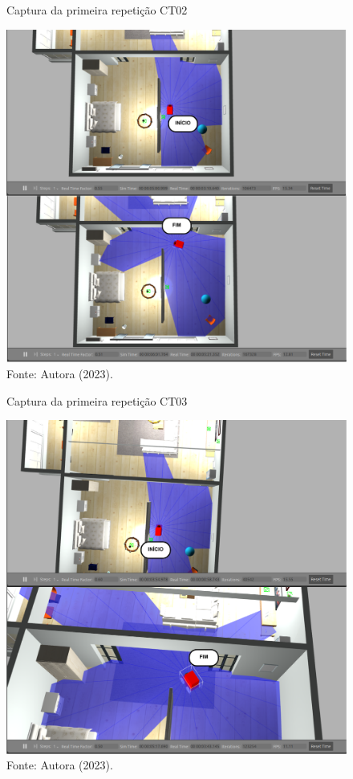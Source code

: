 \begin{figure}[H]
    \centering
    \caption{Captura da primeira repetição CT02}
    \includegraphics[scale=0.3]{ct02_1.png}
    \caption*{Fonte: Autora (2023).}
    \label{fig:teste1CT02}
\end{figure}

\begin{figure}[H]
    \centering
    \caption{Captura da primeira repetição CT03}
    \includegraphics[scale=0.3]{ct03_1.png}
    \caption*{Fonte: Autora (2023).}
    \label{fig:teste1CT03}
\end{figure}

